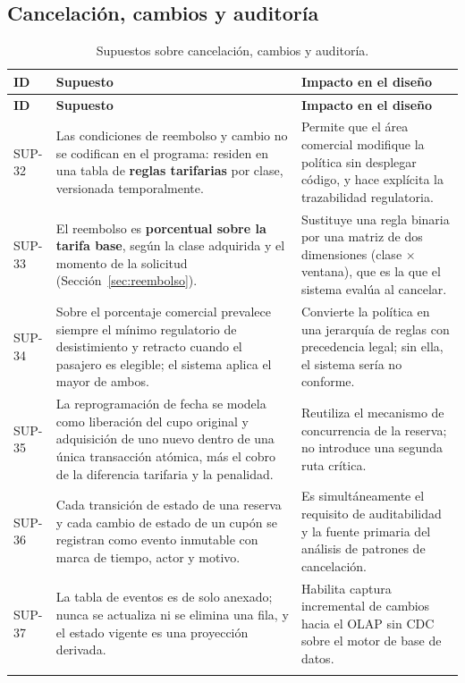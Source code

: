 \documentclass[10pt,letterpaper]{article}
\begin{document}
\subsection{Cancelación, cambios y auditoría}
\begin{longtable}{@{}L{1.7cm} L{7.4cm} L{6.1cm}@{}}
\toprule
\textbf{ID} & \textbf{Supuesto} & \textbf{Impacto en el diseño} \\
\midrule
\endfirsthead
\toprule
\textbf{ID} & \textbf{Supuesto} & \textbf{Impacto en el diseño} \\
\midrule
\endhead
SUP-32 & Las condiciones de reembolso y cambio no se codifican en el programa: residen en una tabla de \textbf{reglas tarifarias} por clase, versionada temporalmente. & Permite que el área comercial modifique la política sin desplegar código, y hace explícita la trazabilidad regulatoria. \\
SUP-33 & El reembolso es \textbf{porcentual sobre la tarifa base}, según la clase adquirida y el momento de la solicitud (Sección~\ref{sec:reembolso}). & Sustituye una regla binaria por una matriz de dos dimensiones (clase $\times$ ventana), que es la que el sistema evalúa al cancelar. \\
SUP-34 & Sobre el porcentaje comercial prevalece siempre el mínimo regulatorio de desistimiento y retracto cuando el pasajero es elegible; el sistema aplica el mayor de ambos. & Convierte la política en una jerarquía de reglas con precedencia legal; sin ella, el sistema sería no conforme. \\
SUP-35 & La reprogramación de fecha se modela como liberación del cupo original y adquisición de uno nuevo dentro de una única transacción atómica, más el cobro de la diferencia tarifaria y la penalidad. & Reutiliza el mecanismo de concurrencia de la reserva; no introduce una segunda ruta crítica. \\
SUP-36 & Cada transición de estado de una reserva y cada cambio de estado de un cupón se registran como evento inmutable con marca de tiempo, actor y motivo. & Es simultáneamente el requisito de auditabilidad y la fuente primaria del análisis de patrones de cancelación. \\
SUP-37 & La tabla de eventos es de solo anexado; nunca se actualiza ni se elimina una fila, y el estado vigente es una proyección derivada. & Habilita captura incremental de cambios hacia el OLAP sin CDC sobre el motor de base de datos. \\
\bottomrule
\caption{Supuestos sobre cancelación, cambios y auditoría.}
\end{longtable}
\end{document}
